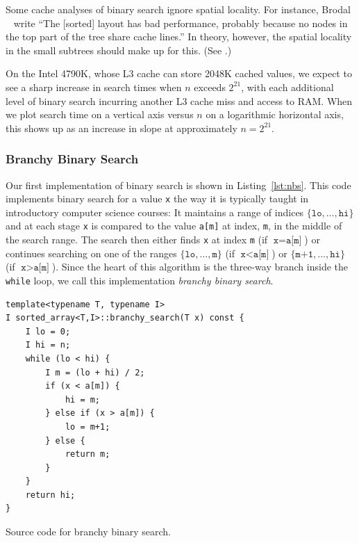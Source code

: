 \documentclass{patmorin}
\newcommand{\lstlabel}[1]{\label{lst:#1}}
\newcommand{\lstref}[1]{Listing~\ref{lst:#1}}
\begin{document}
Some cache analyses of binary search ignore spatial locality.
For instance, Brodal \etal\ \cite{brodal.fagerberg.ea:cache} write
``The [sorted] layout has bad performance, probably because no nodes
in the top part of the tree share cache lines.'' In theory, however,
the spatial locality in the small subtrees should make up for this. (See
.)

On the Intel 4790K, whose L3 cache can store 2048K cached values, we
expect to see a sharp increase in search times when $n$ exceeds $2^{21}$,
with each additional level of binary search incurring another L3 cache
miss and access to RAM.  When we plot search time on a vertical axis
versus $n$ on a logarithmic horizontal axis, this shows up as an increase
in slope at approximately $n=2^{21}$.

\subsubsection{Branchy Binary Search}

Our first implementation of binary search is shown in
\lstref{nbs}. This code implements binary search for a
value \texttt{x} the way it is typically taught in
introductory computer science courses: It maintains a range of indices
$\{\texttt{lo},\ldots,\texttt{hi}\}$ and at each stage
\texttt{x} is compared to the value \texttt{a[m]} at
index, \texttt{m}, in the middle of the search range. The search
then either finds \texttt{x} at index \texttt{m} (if
$\texttt{x}=\texttt{a[m]}$) or continues searching on
one of the ranges $\{\texttt{lo},\ldots,\texttt{m}\}$
(if $\texttt{x}<\texttt{a[m]}$) or
$\{\texttt{m+1},\ldots,\texttt{hi}\}$ (if
$\texttt{x}>\texttt{a[m]}$).  Since the heart of this
algorithm is the three-way branch inside the \texttt{while}
loop, we call this implementation \emph{branchy binary search}.

\begin{listing}
\begin{verbatim}
template<typename T, typename I>
I sorted_array<T,I>::branchy_search(T x) const {
    I lo = 0;
    I hi = n;
    while (lo < hi) {
        I m = (lo + hi) / 2;
        if (x < a[m]) {
            hi = m;
        } else if (x > a[m]) {
            lo = m+1;
        } else {
            return m;
        }
    }
    return hi;
}
\end{verbatim}
\caption{Source code for branchy binary search.}
\lstlabel{nbs}
\end{listing}
\end{document}
